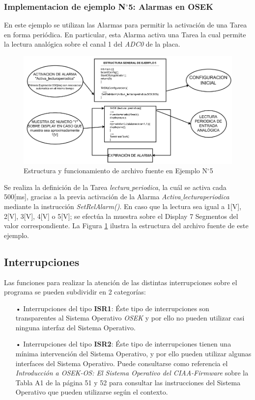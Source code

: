 \documentclass[12pt,letterpaper]{article}
\begin{document}
\subsubsection{Implementacion de ejemplo N$^{\circ}$5: Alarmas en OSEK}
En este ejemplo se utilizan las Alarmas para permitir la activación de una Tarea en forma periódica. En particular, esta Alarma activa una Tarea la cual permite la lectura analógica sobre el canal 1 del \textit{ADC0} de la placa.
\begin{center}
\begin{figure}[!h]
\centering
\includegraphics[width=15 cm]{figuras/f36.png}
\caption{Estructura y funcionamiento de archivo fuente en Ejemplo N$^{\circ}$5}
\label{estructuraej5}
\end{figure}
\end{center}
Se realiza la definición de la Tarea \textit{lectura$\_$periodica}, la cuál se activa cada 500[ms], gracias a la previa activación de la Alarma \textit{Activa$\_$lecturaperiodica} mediante la instrucción \textit{SetRelAlarm()}. En caso que la lectura sea igual a 1[V], 2[V], 3[V], 4[V] o 5[V]; se efectúa la muestra sobre el Display 7 Segmentos del valor correspondiente. La Figura \ref{estructuraej5} ilustra la estructura del archivo fuente de este ejemplo.

\subsection{Interrupciones}
Las funciones para realizar la atención de las distintas interrupciones sobre el programa se pueden subdividir en 2 categorías\cite{libroosekcerdeiro}:
\begin{enumerate}
\item[•]Interrupciones del tipo \textbf{ISR1}: Éste tipo de interrupciones son transparentes al Sistema Operativo \textit{OSEK} y por ello no pueden utilizar casi ninguna interfaz del Sistema Operativo.
\item[•]Interrupciones del tipo \textbf{ISR2}: Éste tipo de interrupciones tienen una mínima intervención del Sistema Operativo, y por ello pueden utilizar algunas interfaces del Sistema Operativo. Puede consultarse como referencia el \textit{Introducción a OSEK-OS: El Sistema Operativo del CIAA-Firmware} sobre la Tabla A1 de la página 51 y 52 para consultar las instrucciones del Sistema Operativo que pueden utilizarse según el contexto.
\end{enumerate}
\end{document}
